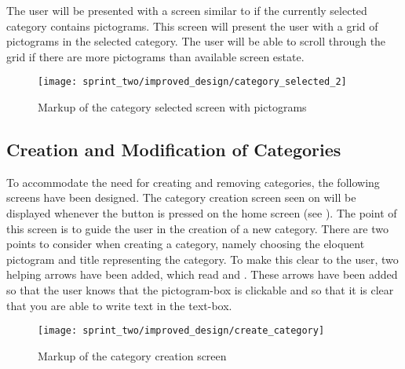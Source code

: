 \FloatBarrier

The user will be presented with a screen similar to  if the currently selected category contains pictograms. This screen will present the user with a grid of pictograms in the selected category. The user will be able to scroll through the grid if there are more pictograms than available screen estate. 

\begin{figure}[!htbp]
    \centering
    \texttt{[image: sprint\_two/improved\_design/category\_selected\_2]}
    \caption{Markup of the category selected screen with pictograms}
    \label{fig:improved_design_category_selected_2}
\end{figure}

\FloatBarrier

\subsection{Creation and Modification of Categories}
To accommodate the need for creating and removing categories, the following screens have been designed. The category creation screen seen on  will be displayed whenever the  button is pressed on the home screen (see ). The point of this screen is to guide the user in the creation of a new category. There are two points to consider when creating a category, namely choosing the eloquent pictogram and title representing the category. To make this clear to the user, two helping arrows have been added, which read  and . These arrows have been added so that the user knows that the pictogram-box is clickable and so that it is clear that you are able to write text in the text-box. 

\begin{figure}[!htbp]
    \centering
    \texttt{[image: sprint\_two/improved\_design/create\_category]}
    \caption{Markup of the category creation screen}
    \label{fig:improved_design_create_category}
\end{figure}

\FloatBarrier

